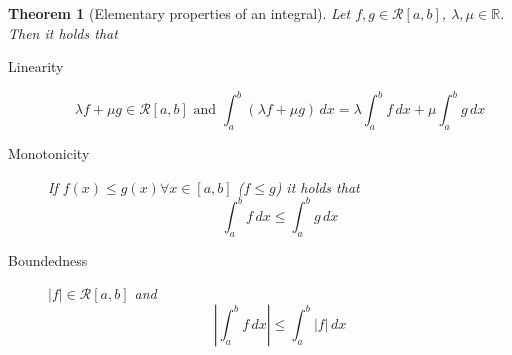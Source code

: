 \documentclass{article}
\newtheorem{theorem}{Theorem}  \numberwithin{theorem}{section}
\newcommand{\card}[1]{\left|#1\right|}
\begin{document}
\begin{theorem}[Elementary properties of an integral]
  Let $f, g \in \mathcal R[a,b]$, $\lambda, \mu \in \mathbb R$.
  Then it holds that
  \begin{description}
    \item[Linearity]
      \[ \lambda f + \mu g \in \mathcal R[a,b] \text{ and } \int_a^b (\lambda f + \mu g) \, dx = \lambda \int_a^b f \, dx + \mu \int_a^b g \, dx \]
    \item[Monotonicity]
      If $f(x) \leq g(x) \forall x \in [a,b]$ ($f \leq g$) it holds that
      \[ \int_a^b f \, dx \leq \int_a^b g \, dx \]
    \item[Boundedness]
      $\card{f} \in \mathcal R[a,b]$  and
      \[ \card{\int_a^b f \, dx} \leq \int_a^b \card{f} \, dx \]
  \end{description}
\end{theorem}
\end{document}
